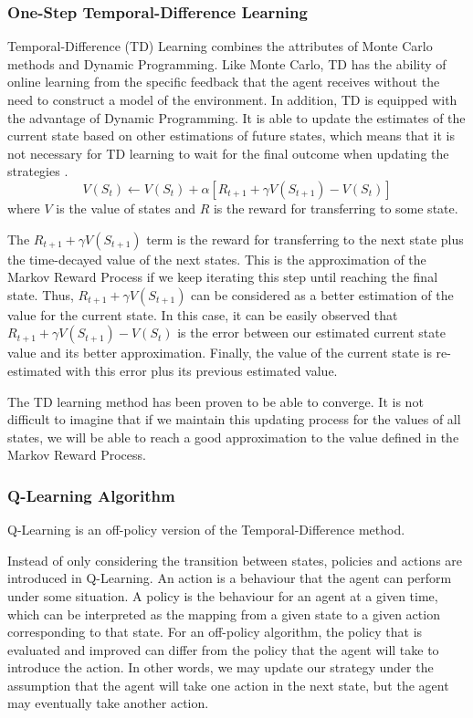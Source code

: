 \subsubsection{One-Step Temporal-Difference Learning}
Temporal-Difference (TD) Learning combines the attributes of Monte Carlo methods and Dynamic Programming. Like Monte Carlo, TD has the ability of online learning from the specific feedback that the agent receives without the need to construct a model of the environment. In addition, TD is equipped with the advantage of Dynamic Programming. It is able to update the estimates of the current state based on other estimations of future states, which means that it is not necessary for TD learning to wait for the final outcome when updating the strategies \cite{alma991000179099701591}.
\begin{equation}
    V(S_t) \leftarrow V(S_t)+\alpha[R_{t+1} + \gamma V(S_{t+1}) - V(S_t)]
\end{equation}
where $V$ is the value of states and $R$ is the reward for transferring to some state.

The $R_{t+1} + \gamma V(S_{t+1})$ term is the reward for transferring to the next state plus the time-decayed value of the next states. This is the approximation of the Markov Reward Process if we keep iterating this step until reaching the final state. Thus, $R_{t+1} + \gamma V(S_{t+1})$ can be considered as a better estimation of the value for the current state. In this case, it can be easily observed that $R_{t+1} + \gamma V(S_{t+1}) - V(S_t)$ is the error between our estimated current state value and its better approximation. Finally, the value of the current state is re-estimated with this error plus its previous estimated value.  

The TD learning method has been proven to be able to converge. It is not difficult to imagine that if we maintain this updating process for the values of all states, we will be able to reach a good approximation to the value defined in the Markov Reward Process.

\subsubsection{Q-Learning Algorithm}
Q-Learning is an off-policy version of the Temporal-Difference method.

Instead of only considering the transition between states, policies and actions are introduced in Q-Learning. An action is a behaviour that the agent can perform under some situation. A policy is the behaviour for an agent at a given time, which can be interpreted as the mapping from a given state to a given action corresponding to that state. For an off-policy algorithm, the policy that is evaluated and improved can differ from the policy that the agent will take to introduce the action. In other words, we may update our strategy under the assumption that the agent will take one action in the next state, but the agent may eventually take another action.

